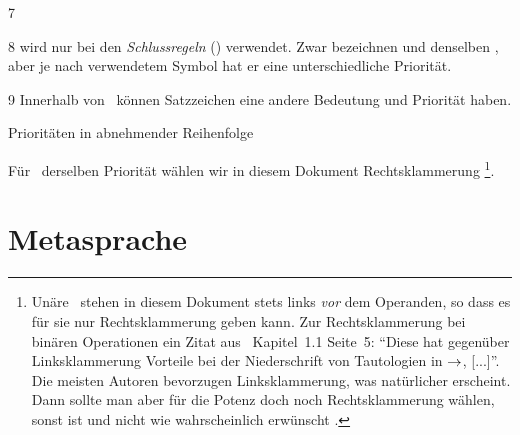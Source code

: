 \begin{table}[p]
\begin{center}
\begin{threeparttable}
\begin{tablenotes}
				\item[7] 
				\item[8] \chrqt{$\srand$} wird nur bei den \emph{Schlussregeln} () verwendet.
				Zwar bezeichnen \chrqt{$\metaandsym$} und \chrqt{$\srand$} denselben \Operator, aber je nach verwendetem Symbol hat er eine unterschiedliche Priorität.
				\item[9] Innerhalb von \Formeln\ können Satzzeichen eine andere Bedeutung und Priorität haben.
			\end{tablenotes}
		\end{threeparttable}
		\caption{Prioritäten in abnehmender Reihenfolge}
		\label{tab:Prioritäten}%
	\end{center}
\end{table}

Für \Operatoren\ derselben Priorität wählen wir in diesem Dokument Rechtsklammerung%
\footnote{%
	Unäre \Operatoren\ stehen in diesem Dokument stets links \emph{vor} dem Operanden, so dass es für sie nur Rechtsklammerung geben kann.
	Zur Rechtsklammerung bei binären Operationen ein Zitat aus~\cite{bib:Rautenberg} Kapitel~1.1 Seite~5:
	\enquote{Diese hat gegenüber Linksklammerung Vorteile bei der Niederschrift von Tautologien in $\rightarrow$, [...]}.
	Die meisten Autoren bevorzugen Linksklammerung, was natürlicher erscheint.
	Dann sollte man aber für die Potenz doch noch Rechtsklammerung wählen, sonst ist  und nicht wie wahrscheinlich erwünscht .
}.

\section{Metasprache}%
\label{sec:Metasprache}

